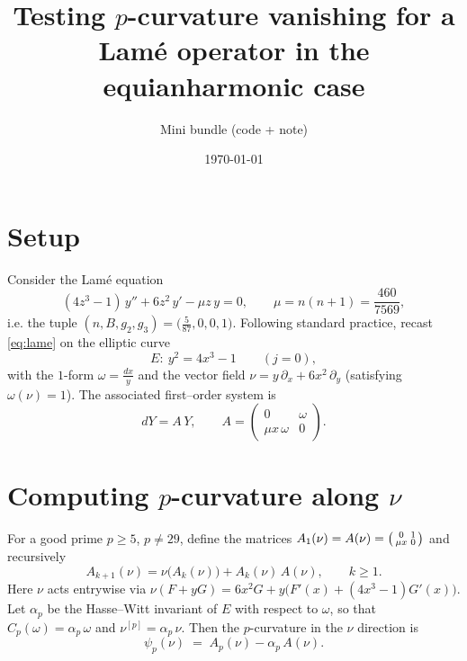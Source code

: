 \documentclass[11pt]{article}
\title{Testing \(p\)-curvature vanishing for a Lam\'e operator in the equianharmonic case}
\author{Mini bundle (code + note)}
\date{\today}
\begin{document}
\maketitle

\section*{Setup}
Consider the Lam\'e equation
\begin{equation}\label{eq:lame}
(4z^3-1)\,y'' + 6z^2\,y' - \mu z\,y = 0,
\qquad \mu = n(n+1)=\frac{460}{7569},
\end{equation}
i.e. the tuple \((n,B,g_2,g_3)=\bigl(\tfrac{5}{87},0,0,1\bigr)\).
Following standard practice, recast \eqref{eq:lame} on the elliptic curve
\begin{equation*}
E:\ y^2=4x^3-1\qquad(j=0),
\end{equation*}
with the \(1\)-form \(\omega=\frac{dx}{y}\) and the vector field
\(\nu = y\,\partial_x + 6x^2\,\partial_y\) (satisfying \(\omega(\nu)=1\)).
The associated first--order system is
\begin{equation}\label{eq:system}
dY = A\,Y,\qquad
A=\begin{pmatrix}0&\omega\\ \mu x\,\omega&0\end{pmatrix}.
\end{equation}

\section*{Computing \(p\)-curvature along \(\nu\)}
For a good prime \(p\ge 5\), \(p\neq 29\), define the matrices
\(
A_1(\nu)=A(\nu)=\begin{psmallmatrix}0&1\\ \mu x&0\end{psmallmatrix}
\)
and recursively
\begin{equation}\label{eq:recurrence}
A_{k+1}(\nu) = \nu\big(A_k(\nu)\big) + A_k(\nu)\,A(\nu),\qquad k\ge 1.
\end{equation}
Here \(\nu\) acts entrywise via
\(\nu(F+yG)=6x^2G + y\big(F'(x)+(4x^3-1)G'(x)\big)\).
Let \(\alpha_p\) be the Hasse--Witt invariant of \(E\) with respect to \(\omega\), so that
\(
C_p(\omega)=\alpha_p\,\omega
\)
and \(\nu^{[p]}=\alpha_p\,\nu\).
Then the \(p\)-curvature in the \(\nu\) direction is
\begin{equation}\label{eq:psiformula}
\psi_p(\nu) \;=\; A_p(\nu) - \alpha_p\,A(\nu).
\end{equation}
\end{document}
